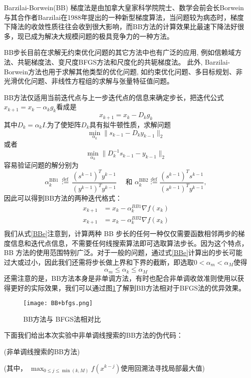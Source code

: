 Barzilai-Borwein(BB) 梯度法\cite{barzilai1988two}是由加拿大皇家科学院院士、数学会前会长Borwein与其合作者Barzilai在1988年提出的一种新型梯度算法，当问题较为病态时，梯度下降法的收敛性质往往会收到很大影响，而BB方法的计算效果比最速下降法好很多，现已成为解决大规模问题的极具竞争力的一种方法。

BB步长目前在求解无约束优化问题的其它方法中也有广泛的应用, 例如信赖域方法、共轭梯度法、变尺度BFGS方法和尺度化的共轭梯度法。 此外, Barzilai-Borwein方法也用于求解其他类型的优化问题, 如约束优化问题、多目标规划、非光滑优化问题、非线性方程组的求解与张量特征值问题。

BB方法仅适用当前迭代点与上一步迭代点的信息来确定步长，把迭代公式 $ x_{k+1}=x_{k}-\alpha_{k}g_{k} $看成是
$$ x_{k+1}=x_{k}-D_{k}g_{k}$$
其中$ D_{k}=\alpha_{k}I $.为了使矩阵$ D_{k} $具有拟牛顿性质，求解问题
$$ \min_{\alpha_{k}} \| s_{k-1}-D_{k}y_{k-1} \|_{2}$$
或者
$$ \min_{\alpha_{k}} \| D_{k}^{-1}s_{k-1}-y_{k-1} \|_{2} $$
容易验证问题的解分别为
\begin{equation}\label{BBe}
	\alpha^{\mathrm{BB} 1}_{k} \stackrel{\text { def }}{:=} \frac{\left(s^{k-1}\right)^{T} y^{k-1}}{\left(y^{k-1}\right)^{T} y^{k-1}} \quad \text { 和 } \alpha^{\mathrm{BB} 2}_{k} \stackrel{\operatorname{def}}{:=} \frac{\left(s^{k-1}\right)^{T} s^{k-1}}{\left(s^{k-1}\right)^{T} y^{k-1}},
\end{equation}
因此可以得到BB方法的两种迭代格式：
\begin{eqnarray*}
	x_{k+1} &= x_{k} -\alpha_{k}^{BB1} \nabla f(x_{k})\\
	x_{k+1} &= x_{k} -\alpha_{k}^{BB2} \nabla f(x_{k})\\
\end{eqnarray*}
我们从式\ref{BBe}注意到，计算两种 BB 步长的任何一种仅仅需要函数相邻两步的梯度信息和迭代点信息，不需要任何线搜索算法即可选取算法步长。因为这个特点，BB 方法的使用范围特别广泛。对于一般的问题，通过式\ref{BBe}计算出的步长可能过大或过小，因此我们还需将步长做上界和下界的截断，即选取$ 0<\alpha_{m}<\alpha_{M} $使得
$$  \alpha_{m} \leq \alpha_{k} \leq \alpha_{M} $$
还需注意的是，BB方法本身是非单调方法，有时也配合非单调收敛准则使用以获得更好的实际效果，我们可以通过图\ref{bfgs}了解到BB方法相对于BFGS法的优异效果。
\begin{figure}
	\centering
	\texttt{[image: BB+bfgs.png]}
	\caption{BB方法与 BFGS法相对比}
	\label{bfgs}
\end{figure}

下面我们给出本次实验中非单调线搜索的BB方法的伪代码： 

\begin{algorithm}[H]
	\caption{(非单调线搜索的BB方法)}
	\renewcommand{\algorithmicrequire}{\textbf{输入:}} 
	\renewcommand{\algorithmicensure}{\textbf{输出:}}	
\end{algorithm}
(其中， $ \max _{0 \leqslant j \leqslant \min (k, M)} f\left(x^{k-j}\right) $使用回溯法寻找局部最大值)


